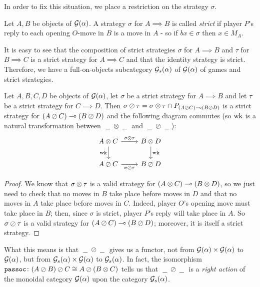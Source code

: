 \documentclass[11pt]{article} %
\begin{document}
In order to fix this situation, we place a restriction on the strategy $\sigma$.

\begin{definition}
  Let $A,B$ be objects of $\mathcal G(\alpha)$.  A strategy $\sigma$ for $A\implies B$ is called \emph{strict} if player $P$'s reply to each opening $O$-move in $B$ is a move in $A$ - so if $bx\in\sigma$ then $x\in M_A$.

  It is easy to see that the composition of strict strategies $\sigma$ for $A\implies B$ and $\tau$ for $B\implies C$ is a strict strategy for $A\implies C$ and that the identity strategy is strict.  Therefore, we have a full-on-objects subcategory $\mathcal G_s(\alpha)$ of $\mathcal G(\alpha)$ of games and strict strategies.
\end{definition}

\begin{proposition}
  Let $A,B,C,D$ be objects of $\mathcal G(\alpha)$, let $\sigma$ be a strict strategy for $A\implies B$ and let $\tau$ be a strict strategy for $C\implies D$.  Then $\sigma\oslash\tau=\sigma\otimes\tau\cap P_{(A\oslash C)\multimap (B\oslash D)}$ is a strict strategy for $(A\oslash C)\multimap (B\oslash D)$ and the following diagram commutes (so $\operatorname{wk}$ is a natural transformation between $\;\underline{\hspace{1.5ex}}\;\otimes\;\underline{\hspace{1.5ex}}\;$ and $\;\underline{\hspace{1.5ex}}\;\oslash\;\underline{\hspace{1.5ex}}\;$):
  \[
    \begin{tikzcd}
      A\tensor C \arrow[r, "\sigma\tensor\tau"] \arrow[d, "\wk"']
        & B\tensor D \arrow[d, "\wk"] \\
      A\sequoid C \arrow[r, "\sigma\sequoid\tau"']
        & B\sequoid D
    \end{tikzcd}
    \]

  \begin{proof}
    We know that $\sigma\otimes\tau$ is a valid strategy for $(A\otimes C)\multimap (B\otimes D)$, so we just need to check that no moves in $B$ take place before moves in $D$ and that no moves in $A$ take place before moves in $C$.  Indeed, player $O$'s opening move must take place in $B$; then, since $\sigma$ is strict, player $P$'s reply will take place in $A$.  So $\sigma\oslash\tau$ is a valid strategy for $(A\oslash C)\multimap(B\oslash D)$; moreover, it is itself a strict strategy.
  \end{proof}
\end{proposition}

What this means is that $\;\underline{\hspace{1.5ex}}\;\oslash\;\underline{\hspace{1.5ex}}\;$ gives us a functor, not from $\mathcal G(\alpha)\times\mathcal G(\alpha)$ to $\mathcal G(\alpha)$, but from $\mathcal G_s(\alpha)\times\mathcal G(\alpha)$ to $\mathcal G_s(\alpha)$.  In fact, the isomorphism ${\texttt{passoc}}\colon (A\oslash B)\oslash C\cong A\oslash(B\otimes C)$ tells us that $\;\underline{\hspace{1.5ex}}\;\oslash\;\underline{\hspace{1.5ex}}\;$ is a \emph{right action} of the monoidal category $\mathcal G(\alpha)$ upon the category $\mathcal G_s(\alpha)$.  
\end{document}

